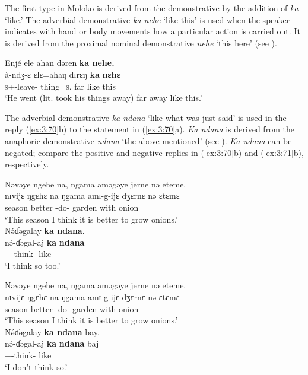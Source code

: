 The first type in Moloko is derived from the demonstrative by the addition of \textit{ka} ‘like.’ The adverbial demonstrative \textit{ka nehe} ‘like this’  is used when the speaker indicates with hand or body movements how a particular action is carried out. It is derived from the proximal nominal demonstrative \textit{nehe} ‘this here’ (see ).

\ea \label{ex:3:69}
Enjé  ele  ahan  dəren  \textbf{ka  nehe.}\\
\gll  à-ndʒ-ɛ  ɛlɛ=ahaŋ    dɪrɛŋ  \textbf{ka}  \textbf{nɛhɛ}\\
      \textsc{s}+{\PFV}-leave-{\CL}  thing=\textsc{s}.{\POSS}  far  like   this\\
\glt  ‘He went (lit. took his things away) far away like this.’  
\z

The adverbial demonstrative \textit{ka ndana} ‘like what was just said’ is used  in the reply (\ref{ex:3:70}b) to the statement in (\ref{ex:3:70}a). \textit{Ka ndana} is derived from the anaphoric demonstrative \textit{ndana} ‘the above-mentioned’ (see ). \textit{Ka ndana} can be negated; compare the positive and negative replies in (\ref{ex:3:70}b) and (\ref{ex:3:71}b), respectively.

\ea \label{ex:3:70}
\ea Nəvəye  ngehe  na,  ngama  aməgəye  jerne  nə  eteme. \\
\gll  nɪvijɛ  ŋgɛhɛ    na    ŋgama   amɪ-g-ijɛ  dʒɛrnɛ   nə    ɛtɛmɛ  \\
      season  {\DEM}   {\PSP}    better    {\DEP}-do-{\CL}        garden  with      onion  \\
\glt  ‘This season I think it is better to grow onions.’ \\
\ex
N\'{ə}ɗəgalay  \textbf{ka  ndana}.\\
\gll n\'{ə}-ɗəgal-aj  \textbf{ka}  \textbf{ndana}\\
     {\oneS}+{\IFV}-think-{\CL}  like  {\DEM}\\
\glt ‘I think so too.’\\     
\z\z

\ea \label{ex:3:71}
\ea Nəvəye  ngehe  na,  ngama  aməgəye  jerne  nə  eteme.       \\
\gll  nɪvijɛ   ŋgɛhɛ  na   ŋgama    amɪ-g-ijɛ  dʒɛrnɛ  nə      ɛtɛmɛ  \\
      season  {\DEM}    {\PSP}    better   {\DEP}-do-{\CL}  garden  with     onion  \\
\glt  ‘This season I think it is better to grow onions.’        \\
\ex
 N\'{ə}ɗəgalay  \textbf{ka  ndana}  bay.\\
 \gll n\'{ə}-ɗəgal-aj      \textbf{ka}  \textbf{ndana}   baj\\
      {\oneS}+{\IFV}-think-{\CL}  like {\DEM}   {\NEG}\\
 \glt ‘I don’t think so.’
 \z\z

